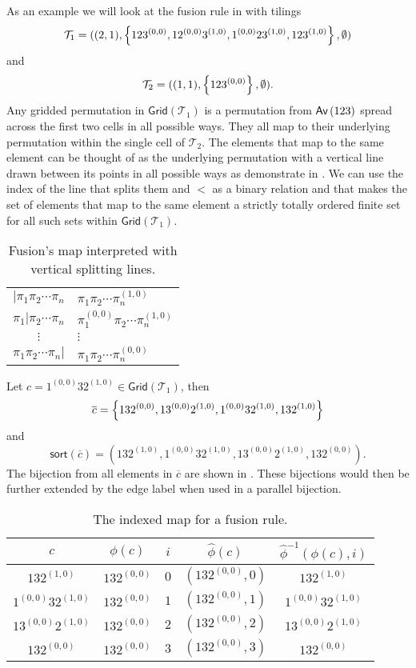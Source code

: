 As an example we will look at the fusion rule in  with tilings
\[
    \mathcal{T}_1 = ((2,1), \left\{123^{(0,0)},12^{(0,0)}3^{(1,0)},1^{(0,0)}23^{(1,0)},123^{(1,0)}\right\}, \emptyset)
\]
and
\[
    \mathcal{T}_2 = ((1,1),\left\{123^{(0,0)}\right\}, \emptyset).
\]
Any gridded permutation in $\textsf{Grid}(\mathcal{T}_1)$ is a permutation from $\textsf{Av}\left(123\right)$ spread across the first two cells in all possible ways. They all map to their underlying permutation within the single cell of $\mathcal{T}_2$. The elements that map to the same element can be thought of as the underlying permutation with a vertical line drawn between its points in all possible ways as demonstrate in . We can use the index of the line that splits them and $<$ as a binary relation and that makes the set of elements that map to the same element a strictly totally ordered finite set for all such sets within $\textsf{Grid}(\mathcal{T}_1)$.

\begin{table}[ht!]
    \centering
    \begin{tabular}{c|l}
        $|\pi_1\pi_2\dotsm\pi_n$ & $\pi_1\pi_2\dotsm\pi_n^{(1,0)}$ \\
        $\pi_1|\pi_2\dotsm\pi_n$ & $\pi_1^{(0,0)}\pi_2\dotsm\pi_n^{(1,0)}$ \\
        $\vdots$ & \hspace{1cm}$\vdots$ \\
        $\pi_1\pi_2\dotsm\pi_n|$ & $\pi_1\pi_2\dotsm\pi_n^{(0,0)}$ \\
    \end{tabular}
    \caption{Fusion's map interpreted with vertical splitting lines.}
    \label{tab:fuseline}
\end{table}

Let $c = 1^{(0,0)}32^{(1,0)} \in \textsf{Grid}(\mathcal{T}_1)$, then
\[
    \overline{c} = \left\{132^{(0,0)},13^{(0,0)}2^{(1,0)}, 1^{(0,0)}32^{(1,0)}, 132^{(1,0)}\right\}
\]
and 
\[
    \textsf{sort}(\overline{c}) = \left(132^{(1,0)},1^{(0,0)}32^{(1,0)},13^{(0,0)}2^{(1,0)},132^{(0,0)}\right).
\]
The bijection from all elements in $\overline{c}$ are shown in . These bijections would then be further extended by the edge label when used in a parallel bijection.

\begin{table}[ht!]
    \centering
    \begin{tabular}{c|c|c|c|c}
        $c$ & $\phi(c)$ & $i$ & $\hat{\phi}(c)$ & $\hat{\phi}^{-1}(\phi(c),i)$\\
        \hline
        $132^{(1,0)}$ & $132^{(0,0)}$ & $0$ & $\left(132^{(0,0)}, 0\right)$ & $132^{(1,0)}$ \\
        $1^{(0,0)}32^{(1,0)}$ & $132^{(0,0)}$ & $1$ & $\left(132^{(0,0)}, 1\right)$ & $1^{(0,0)}32^{(1,0)}$ \\
        $13^{(0,0)}2^{(1,0)}$ & $132^{(0,0)}$ & $2$ & $\left(132^{(0,0)}, 2\right)$ & $13^{(0,0)}2^{(1,0)}$\\
        $132^{(0,0)}$ & $132^{(0,0)}$ & $3$ & $\left(132^{(0,0)}, 3\right)$ & $132^{(0,0)}$
    \end{tabular}
    \caption{The indexed map for a fusion rule.}
    \label{tab:fuseidxmap}
\end{table}

